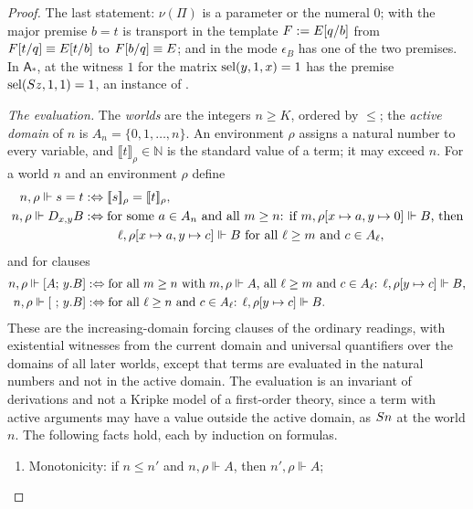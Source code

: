 \begin{proof}
The last statement: $\nu(\Pi)$ is a parameter or the numeral $0$;
 with the major premise $b=t$ is transport in the template
$F\mathrel{:=} E[q/b]$ from $F[t/q]\equiv E[t/b]$ to
$F[b/q]\equiv E$; and  in the mode $\epsilon_B$ has one
of the two premises.  In $\mathsf{A}_{\ast}$,  at the witness
$1$ for the matrix $\operatorname{sel}(y,1,x)=1$ has the premise $\operatorname{sel}(S z,1,1)=1$, an
instance of .

\emph{The evaluation.}  The \emph{worlds} are the integers $n\ge K$, ordered
by $\le$; the \emph{active domain} of $n$ is $A_n=\{0,1,\dots,n\}$.  An
environment $\rho$ assigns a natural number to every variable, and
$\llbracket t\rrbracket_\rho\in\mathbb{N}$ is the standard value of a term; it may
exceed $n$.  For a world $n$ and an environment $\rho$ define
\begin{align*}
 n,\rho\Vdash s=t &\mathrel{:\Leftrightarrow} [\![ s]\!]_\rho=[\![ t]\!]_\rho,\\
 n,\rho\Vdash D_{x,y}B &\mathrel{:\Leftrightarrow} \text{for some $a\in A_n$ and all $m\ge n$:
   if $m,\rho[x\mapsto a,y\mapsto 0]\Vdash B$, then}\\
 &\qquad\ \ \ell,\rho[x\mapsto a,y\mapsto c]\Vdash B
   \text{ for all $\ell\ge m$ and $c\in A_\ell$},
\end{align*}
and for clauses
\begin{align*}
 n,\rho\Vdash[A;\,y.B] &\mathrel{:\Leftrightarrow} \text{for all $m\ge n$ with $m,\rho\Vdash A$,
   all $\ell\ge m$ and $c\in A_\ell$: } \ell,\rho[y\mapsto c]\Vdash B,\\
 n,\rho\Vdash[\ ;\,y.B] &\mathrel{:\Leftrightarrow} \text{for all $\ell\ge n$ and $c\in A_\ell$: }
   \ell,\rho[y\mapsto c]\Vdash B .
\end{align*}
These are the increasing-domain forcing clauses of the ordinary readings,
with existential witnesses from the current domain and universal
quantifiers over the domains of all later worlds, except that terms are
evaluated in the natural numbers and not in the active domain.  The
evaluation is an invariant of derivations and not a Kripke model of a
first-order theory, since a term with active arguments may have a value
outside the active domain, as $S n$ at the world $n$.
The following facts hold, each by induction on formulas.
\begin{enumerate}[label=\textup{(\alph*)}]
\item Monotonicity: if $n\le n'$ and $n,\rho\Vdash A$, then $n',\rho\Vdash A$;

\end{enumerate}
\end{proof}
